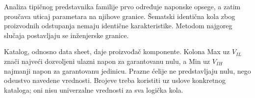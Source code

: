 Analiza tipičnog predstavnika familije prvo određuje naponske opsege, a zatim proučava uticaj parametara na njihove granice. Šematski identična kola zbog proizvodnih odstupanja nemaju identične karakteristike. Metodom najgoreg slučaja postavljaju se inženjerske granice.

Katalog, odnosno data sheet, daje proizvođač komponente. Kolona Max uz $V_{IL}$ znači najveći dozvoljeni ulazni napon za garantovanu nulu, a Min uz $V_{IH}$ najmanji napon za garantovanu jedinicu. Prazne ćelije ne predstavljaju nulu, nego odsustvo navedene vrednosti. Brojeve treba koristiti uz uslove konkretnog kataloga; oni nisu univerzalne vrednosti za sva logička kola.
